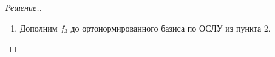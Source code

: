 \documentclass[a4paper]{article}
\theoremstyle{remark}
\begin{document}
\begin{proof}[Решение.]
\begin{enumerate}
\begin{itemize}
\begin{multline*}
                    \end{multline*}
                    \item Проверим -1.
                    \begin{multline*}
                        \begin{pmatrix}
                            \nicefrac53 & -\nicefrac23 & \nicefrac13 \\
                            \nicefrac23 & \nicefrac43 & \nicefrac23 \\
                            \nicefrac13 & \nicefrac23 & \nicefrac13 \\
                        \end{pmatrix} 
                        \rightarrow
                        \begin{pmatrix}
                            5 & -2 & 1 \\
                            2 & 4 & 2 \\
                            1 & 2 & 1 \\
                        \end{pmatrix} 
                        \rightarrow
                        \begin{pmatrix}
                            1 & 2 & 1 \\
                            6 & 0 & 0 \\
                        \end{pmatrix} \Rightarrow \text{ФСР = } 
                        \begin{pmatrix}
                            0\\
                            1\\
                            -2
                        \end{pmatrix}, f_3 = 
                        \begin{pmatrix}
                            0\\
                            \nicefrac1{\sqrt{5}}\\
                            -\nicefrac2{\sqrt{5}}
                        \end{pmatrix}\\
                    \end{multline*}
                    $f_3$ --- ось поворота.
                \end{itemize}
                \item Дополним $f_3$ до ортонормированного базиса по ОСЛУ из пункта 2. 

\end{enumerate}
\end{proof}
\end{document}
